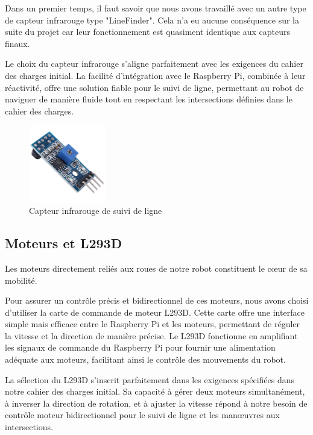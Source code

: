 Dans un premier temps, il faut savoir que nous avons travaillé avec un autre type de capteur infrarouge type "LineFinder". Cela n'a eu aucune conséquence sur la suite du projet car leur fonctionnement est quasiment identique aux capteurs finaux.

Le choix du capteur infrarouge s'aligne parfaitement avec les exigences du cahier des charges initial. La facilité d'intégration avec le Raspberry Pi, combinée à leur réactivité, offre une solution fiable pour le suivi de ligne, permettant au robot de naviguer de manière fluide tout en respectant les intersections définies dans le cahier des charges.

\begin{figure}
    \centering
    \includegraphics[width=0.3\textwidth]{images/line_finder.jpg}
    \caption{Capteur infrarouge de suivi de ligne}
    \label{fig:TCRT5000}
\end{figure}

\subsection{Moteurs et L293D}
Les moteurs directement reliés aux roues de notre robot constituent le cœur de sa mobilité.

Pour assurer un contrôle précis et bidirectionnel de ces moteurs, nous avons choisi d'utiliser la carte de commande de moteur L293D. Cette carte offre une interface simple mais efficace entre le Raspberry Pi et les moteurs, permettant de réguler la vitesse et la direction de manière précise. Le L293D fonctionne en amplifiant les signaux de commande du Raspberry Pi pour fournir une alimentation adéquate aux moteurs, facilitant ainsi le contrôle des mouvements du robot.

La sélection du L293D s'inscrit parfaitement dans les exigences spécifiées dans notre cahier des charges initial. Sa capacité à gérer deux moteurs simultanément, à inverser la direction de rotation, et à ajuster la vitesse répond à notre besoin de contrôle moteur bidirectionnel pour le suivi de ligne et les manœuvres aux intersections.

